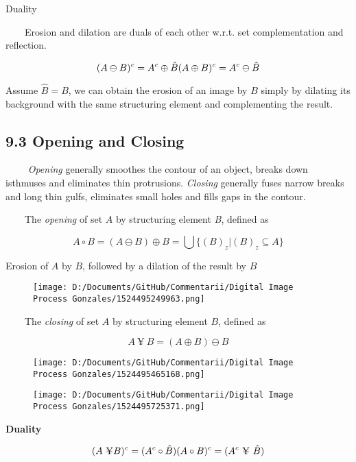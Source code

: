 \documentclass[]{article}
\begin{document}
Duality

\(\quad\quad\)Erosion and dilation are duals of each other w.r.t. set
complementation and reflection.

\[(A\ominus B)^c=A^c\oplus \hat{B}\\
(A\oplus B)^c=A^c\ominus \hat{B}\]

Assume \(\hat{B}=B\), we can obtain the erosion of an image by \(B\)
simply by dilating its background with the same structuring element and
complementing the result.

\subsection{9.3 Opening and Closing}\label{header-n165}

\(\quad\quad\) \emph{Opening} generally smoothes the contour of an
object, breaks down isthmuses and eliminates thin protrusions.
\emph{Closing} generally fuses narrow breaks and long thin gulfs,
eliminates small holes and fills gaps in the contour.

\(\quad\quad\)The \emph{opening} of set \(A\) by structuring element
\emph{B}, defined as

\[A\circ B=(A\ominus B)\oplus B=\bigcup\{(B)_z|(B)_z\subseteq A\}\]

Erosion of \(A\) by \(B\), followed by a dilation of the result by \(B\)

\begin{figure}
\centering
\texttt{[image: D:/Documents/GitHub/Commentarii/Digital Image Process Gonzales/1524495249963.png]}
\caption{}
\end{figure}

\(\quad\quad\)The \emph{closing} of set \(A\) by structuring element
\(B\), defined as

\[A\ \yen\ B=(A\oplus B)\ominus B\]

\begin{figure}
\centering
\texttt{[image: D:/Documents/GitHub/Commentarii/Digital Image Process Gonzales/1524495465168.png]}
\caption{}
\end{figure}

\begin{figure}
\centering
\texttt{[image: D:/Documents/GitHub/Commentarii/Digital Image Process Gonzales/1524495725371.png]}
\caption{}
\end{figure}

\textbf{Duality}

\[(A\ \yen B)^c=(A^c\circ\hat{B})\\
(A\circ B)^c=(A^c\ \yen\ \hat{B})\]
\end{document}
